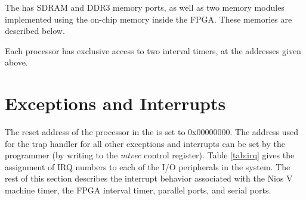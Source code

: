 The {\it \systemNameFull} has SDRAM and DDR3 memory ports, as well as two memory modules 
implemented using the on-chip memory inside the FPGA. These memories are described below.

















Each {\processor} processor has exclusive access to two interval timers, at the addresses
given above.


\section{Exceptions and Interrupts}
\label{sec:exceptions}

The reset address of the {\processor} processor in the {\it \systemNameFull} is set to
{\sf 0x00000000}. The address used for the trap handler for all other exceptions and 
interrupts can be set by the programmer (by writing to the {\it mtvec} control register). 
Table \ref{tab:irq} gives the assignment of IRQ numbers to each of the I/O peripherals in 
the system. The rest of this section describes the interrupt behavior associated 
with the Nios V machine timer, the FPGA interval timer, parallel ports, and serial ports.

